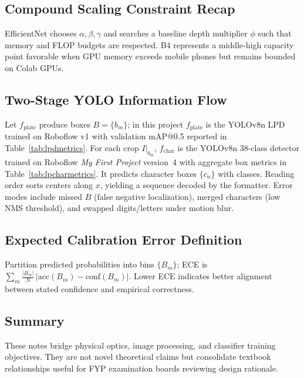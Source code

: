 \subsection{Compound Scaling Constraint Recap}
EfficientNet chooses $\alpha,\beta,\gamma$ and searches a baseline depth multiplier $\phi$ such that memory and FLOP budgets are respected. B4 represents a middle-high capacity point favorable when GPU memory exceeds mobile phones but remains bounded on Colab GPUs.

\subsection{Two-Stage YOLO Information Flow}
Let $f_{\mathrm{plate}}$ produce boxes $B=\{b_m\}$; in this project $f_{\mathrm{plate}}$ is the YOLOv8n LPD trained on Roboflow v1 with validation mAP@0.5 reported in Table~\ref{tab:lpdmetrics}. For each crop $I|_{b_m}$, $f_{\mathrm{char}}$ is the YOLOv8n 38-class detector trained on Roboflow \emph{My First Project} version~4 with aggregate box metrics in Table~\ref{tab:lpcharmetrics}. It predicts character boxes $\{c_n\}$ with classes. Reading order sorts centers along $x$, yielding a sequence decoded by the formatter. Error modes include missed $B$ (false negative localization), merged characters (low NMS threshold), and swapped digits/letters under motion blur.

\subsection{Expected Calibration Error Definition}
Partition predicted probabilities into bins $\{B_m\}$; ECE is $\sum_m \frac{|B_m|}{N}\,|\mathrm{acc}(B_m)-\mathrm{conf}(B_m)|$. Lower ECE indicates better alignment between stated confidence and empirical correctness.

\subsection{Summary}
These notes bridge physical optics, image processing, and classifier training objectives. They are not novel theoretical claims but consolidate textbook relationships useful for FYP examination boards reviewing design rationale.

